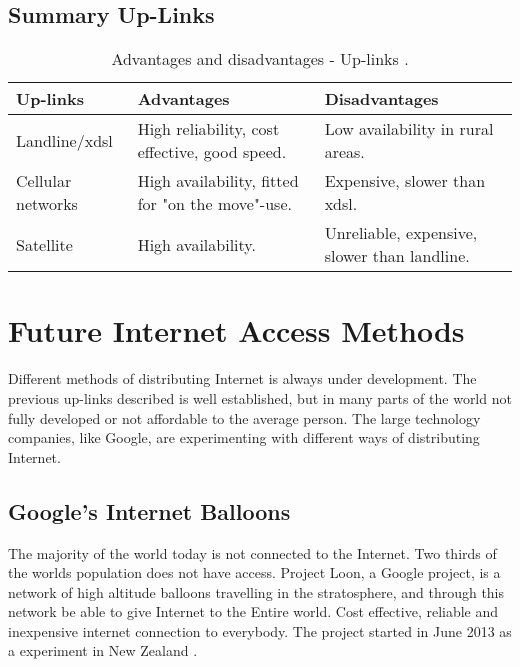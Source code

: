 \subsection{Summary Up-Links}

\begin{center}
\begin{table}[!h]
\caption{\label{tab:uplinks}Advantages and disadvantages - Up-links \cite{comparisonuplinks}.}
    \begin{tabular}{ | l | p{4cm} | p{5cm} |}
    \hline
    \textbf{Up-links} & \textbf{Advantages} & \textbf{Disadvantages} \\ 
    \hline
    Landline/x\gls{dsl} & High reliability, cost effective, good speed. & Low availability in rural areas. \\ 
    \hline
     Cellular networks & High availability, fitted for "on the move"-use. & Expensive, slower than x\gls{dsl}.\\
    \hline
    Satellite & High availability.  & Unreliable, expensive, slower than landline.\\ 
    \hline
    \end{tabular}
   \end{table}
\end{center}


\section{Future Internet Access Methods}
Different methods of distributing Internet is always under development. The previous up-links described is well established, but in many parts of the world not fully developed or not affordable to the average person. The large technology companies, like Google, are experimenting with different ways of distributing Internet. 

\subsection{Google's Internet Balloons}
The majority of the world today is not connected to the Internet. Two thirds of the worlds population does not have access. Project Loon, a Google project, is a network of high altitude balloons travelling in the stratosphere, and through this network be able to give Internet to the Entire world. Cost effective, reliable and inexpensive internet connection to everybody. The project started in June 2013 as a experiment in New Zealand \cite{loon}. 

